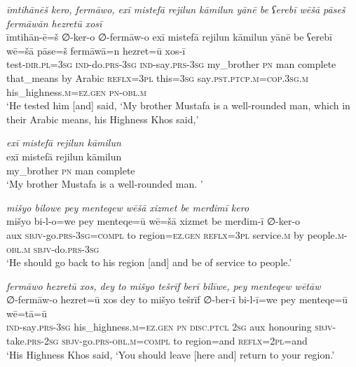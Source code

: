 \ea \label{ŽP.83}
\textit{īmtihānēš kero, fermāwo, exī mistefā rejilun kāmilun yānē be ʕerebī wēšā pāseš fermāwān hezretū xosī} \\ 
\gll īmtihān-ē=š ∅-ker-o ∅-fermāw-o exī mistefā rejilun kāmilun yānē be ʕerebī wē=šā pāse=š fermāwā=n hezret=ū xos-ī \\ 
 test\textsc{-dir}\textsc{.pl}\textsc{=3sg} \textsc{ind-}do\textsc{.prs}\textsc{-3sg} \textsc{ind-}say\textsc{.prs}\textsc{-3sg} my\_brother \textsc{pn} man complete that\_means by Arabic \textsc{reflx}\textsc{=3pl} this\textsc{=3sg} say\textsc{.pst}\textsc{.ptcp}\textsc{.m}\textsc{=cop}\textsc{.3sg}\textsc{.m} his\_highness\textsc{.m}\textsc{\textsc{=ez.gen}} \textsc{pn}\textsc{-obl}\textsc{.m} \\ 
\glt `He tested him [and] said, ‘My brother Mustafa is a well-rounded man, which in their Arabic means, his Highness Khos said,'
\z 
 
\ea \label{ŽP.86}
\textit{exī mistefā rejilun kāmilun} \\ 
\gll exī mistefā rejilun kāmilun \\ 
 my\_brother \textsc{pn} man complete \\ 
\glt `My brother Mustafa is a well-rounded man. '
\z 
 
\ea \label{ŽP.87}
\textit{mišyo bilowe pey menteqew wēšā xizmet be merđimī kero} \\ 
\gll mišyo bi-l-o=we pey menteqe=ū wē=šā xizmet be merđim-ī ∅-ker-o \\ 
 aux \textsc{sbjv-}go\textsc{.prs}\textsc{-3sg}\textsc{=compl} to region\textsc{\textsc{=ez.gen}} \textsc{reflx}\textsc{=3pl} service\textsc{.m} by people\textsc{.m}\textsc{-obl}\textsc{.m} \textsc{sbjv-}do\textsc{.prs}\textsc{-3sg} \\ 
\glt `He should go back to his region [and] and be of service to people.'
\z 
 
\ea \label{ŽP.91}
\textit{fermāwo hezretū xos, dey to mišyo tešrīf berī bilīwe, pey menteqew wētāw} \\ 
\gll ∅-fermāw-o hezret=ū xos dey to mišyo tešrīf ∅-ber-ī bi-l-ī=we pey menteqe=ū wē=tā=ū \\ 
 \textsc{ind-}say\textsc{.prs}\textsc{-3sg} his\_highness\textsc{.m}\textsc{\textsc{=ez.gen}} \textsc{pn} \textsc{disc.ptcl} \textsc{2sg} aux honouring \textsc{sbjv-}take\textsc{.prs}-\textsc{2sg} \textsc{sbjv-}go\textsc{.prs}\textsc{-obl}\textsc{.m}\textsc{=compl} to region=and \textsc{reflx}=\textsc{2pl}=and \\ 
\glt `His Highness Khos said, ‘You should leave [here and] return to your region.'
\z 
 
